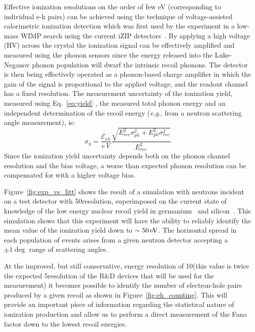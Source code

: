 Effective ionization resolutions on the order of few eV (corresponding to individual e-h pairs) can be achieved using the technique of voltage-assisted calorimetric ionization detection which was first used by the \SuperCDMS experiment in a low-mass WIMP search using the current iZIP detectors~\cite{2014PhRvL.112d1302A,Agnese:2015nto}. By applying a high voltage (HV) across the crystal the ionization signal can be effectively amplified and measured using the phonon sensors since the energy released into the Luke-Neganov phonon population will dwarf the intrinsic recoil phonons. The detector is then being effectively operated as a phonon-based charge amplifier in which the gain of the signal is proportional to the applied voltage, and the readout channel has a fixed resolution.  The measurement uncertainty of the ionization yield, measured using Eq.~\ref{eq:yield} , the measured total phonon energy and an independent determination of the recoil energy (\textit{e.g}., from a neutron scattering angle measurement), is: 
\begin{equation}
\sigma_y= \frac{\mathcal{E}_{eh}}{e\,V}\frac{\sqrt{E_{rec}^2\sigma_{ph}^2+E_{ph}^2\sigma_{rec}^2}}{E_{rec}^2}
\label{eq:yielderr}
\end{equation}
Since the ionization yield uncertainty depends both on the phonon channel resolution and the bias voltage, a worse than expected phonon resolution can be compensated for with a higher voltage bias. %

Figure~\ref{fig:exp_vs_litt} shows the result of a simulation %
with neutrons incident on a test detector with 50\eV resolution, superimposed on the current state of knowledge of the low energy nuclear recoil yield in germanium~\cite{2013APh....48....8B} and silicon~\cite{1965PhRv..138.1815S,1990PhRvD..42.3211G,1992PhRvA..45.2104D,Chavarria:2016arXiv}. This simulation shows that this experiment will have the ability to reliably identify the mean value of the ionization yield down to \(\sim 50\,\mathrm{eV}\). The horizontal spread in each population of events arises from a given neutron detector accepting a \(\pm 1\deg\) range of scattering angles.

At the improved, but still conservative, energy resolution of 10\eV (this value is twice the expected 5\eV resolution of the \SuperCDMS R\&D devices that will be used for the measurement) it becomes possible to identify the number of electron-hole pairs produced by a given recoil as shown in Figure~\ref{fig:eh_counting}. This will provide an important piece of information regarding the statistical nature of ionization production and allow us to perform a direct measurement of the Fano factor down to the lowest recoil energies.


